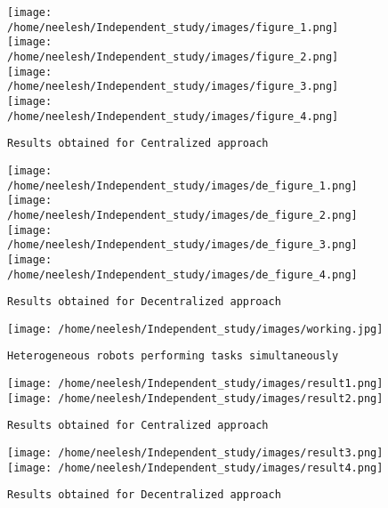 \documentclass[conference]{IEEEtran}
\begin{document}
{\begin{figure}
\hfill\begin{minipage}{0.5\textwidth}\centering
\texttt{[image: /home/neelesh/Independent\_study/images/figure\_1.png]}
\texttt{[image: /home/neelesh/Independent\_study/images/figure\_2.png]}
\texttt{[image: /home/neelesh/Independent\_study/images/figure\_3.png]}
\texttt{[image: /home/neelesh/Independent\_study/images/figure\_4.png]}
\caption{\texttt{Results obtained for Centralized approach}}\label{Cen_agents}
\end{minipage}
\end{figure}

\begin{figure}
\hfill\begin{minipage}{0.5\textwidth}\centering
\texttt{[image: /home/neelesh/Independent\_study/images/de\_figure\_1.png]}
\texttt{[image: /home/neelesh/Independent\_study/images/de\_figure\_2.png]}
\texttt{[image: /home/neelesh/Independent\_study/images/de\_figure\_3.png]}
\texttt{[image: /home/neelesh/Independent\_study/images/de\_figure\_4.png]}
\caption{\texttt{Results obtained for Decentralized approach}}\label{Decen_agents}
\end{minipage}
\end{figure}
\begin{figure}
\hfill\begin{minipage}{0.5\textwidth}\centering
\texttt{[image: /home/neelesh/Independent\_study/images/working.jpg]}
\caption{\texttt{Heterogeneous robots performing tasks simultaneously}}\label{simulator}
\texttt{[image: /home/neelesh/Independent\_study/images/result1.png]}
\texttt{[image: /home/neelesh/Independent\_study/images/result2.png]}
\caption{\texttt{Results obtained for Centralized approach}}\label{Cen_results}
\texttt{[image: /home/neelesh/Independent\_study/images/result3.png]}
\texttt{[image: /home/neelesh/Independent\_study/images/result4.png]}
\caption{\texttt{Results obtained for Decentralized approach}}\label{De_results}
\end{minipage}

\end{figure}}
\end{document}
